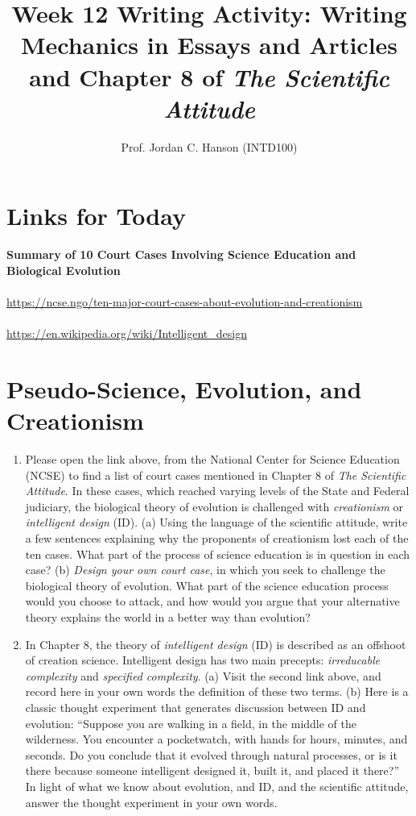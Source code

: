 \documentclass{article}
\begin{document}
\title{Week 12 Writing Activity: Writing Mechanics in Essays and Articles and Chapter 8 of \textit{The Scientific Attitude}}
\author{Prof. Jordan C. Hanson (INTD100)}

\maketitle

\section{Links for Today}
\textbf{Summary of 10 Court Cases Involving Science Education and Biological Evolution} \\ \\
\url{https://ncse.ngo/ten-major-court-cases-about-evolution-and-creationism} \\ \\
\url{https://en.wikipedia.org/wiki/Intelligent_design}

\section{Pseudo-Science, Evolution, and Creationism}

\begin{enumerate}
\item Please open the link above, from the National Center for Science Education (NCSE) to find a list of court cases mentioned in Chapter 8 of \textit{The Scientific Attitude}.  In these cases, which reached varying levels of the State and Federal judiciary, the biological theory of evolution is challenged with \textit{creationism} or \textit{intelligent design} (ID).  (a) Using the language of the scientific attitude, write a few sentences explaining why the proponents of creationism lost each of the ten cases.  What part of the process of science education is in question in each case? (b) \textit{Design your own court case}, in which you seek to challenge the biological theory of evolution.  What part of the science education process would you choose to attack, and how would you argue that your alternative theory explains the world in a better way than evolution? \\ \vspace{3cm}
\item In Chapter 8, the theory of \textit{intelligent design} (ID) is described as an offshoot of creation science.  Intelligent design has two main precepts: \textit{irreducable complexity} and \textit{specified complexity}.  (a) Visit the second link above, and record here in your own words the definition of these two terms.  (b) Here is a classic thought experiment that generates discussion between ID and evolution: ``Suppose you are walking in a field, in the middle of the wilderness.  You encounter a pocketwatch, with hands for hours, minutes, and seconds.  Do you conclude that it evolved through natural processes, or is it there because someone intelligent designed it, built it, and placed it there?''  In light of what we know about evolution, and ID, and the scientific attitude, answer the thought experiment in your own words.
\end{enumerate} 
\end{document}

